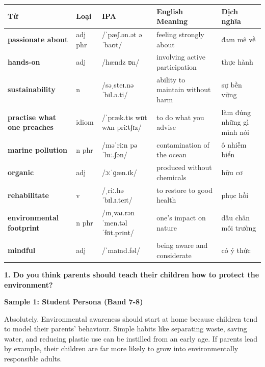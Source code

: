 \vspace{0.8em}
\begin{center}
\renewcommand{\arraystretch}{1.65}
\begin{tabularx}{\textwidth}{|V{0.22\textwidth}|C{0.07\textwidth}|I{0.20\textwidth}|Y|V{0.18\textwidth}|}
\hline
{}
\textbf{Từ} & \textbf{Loại} & \textbf{IPA} & \textbf{English Meaning} & \textbf{Dịch nghĩa} \\
\hline
\textbf{passionate about} & adj phr & /ˈpæʃ.ən.ət əˈbaʊt/ & feeling strongly about & đam mê về \\ \hline
\textbf{hands-on} & adj & /hændz ɒn/ & involving active participation & thực hành \\ \hline
\textbf{sustainability} & n & /səˌsteɪ.nəˈbɪl.ə.ti/ & ability to maintain without harm & sự bền vững \\ \hline
\textbf{practise what one preaches} & idiom & /ˈpræk.tɪs wɒt wʌn priːtʃɪz/ & to do what you advise & làm đúng những gì mình nói \\ \hline
\textbf{marine pollution} & n phr & /məˈriːn pəˈluː.ʃən/ & contamination of the ocean & ô nhiễm biển \\ \hline
\textbf{organic} & adj & /ɔːˈɡæn.ɪk/ & produced without chemicals & hữu cơ \\ \hline
\textbf{rehabilitate} & v & /ˌriː.həˈbɪl.ɪ.teɪt/ & to restore to good health & phục hồi \\ \hline
\textbf{environmental footprint} & n phr & /ɪnˌvaɪ.rənˈmen.təl ˈfʊt.prɪnt/ & one's impact on nature & dấu chân môi trường \\ \hline
\textbf{mindful} & adj & /ˈmaɪnd.fəl/ & being aware and considerate & có ý thức \\ \hline
\end{tabularx}
\end{center}

\partthreeheader

\begin{ieltsquestion}
\textbf{1. Do you think parents should teach their children how to protect the environment?}
\end{ieltsquestion}
\textbf{Sample 1: Student Persona (Band 7-8)}

Absolutely. Environmental awareness should start at home because children tend to model their parents' behaviour. Simple habits like separating waste, saving water, and reducing plastic use can be instilled from an early age. If parents lead by example, their children are far more likely to grow into environmentally responsible adults.

